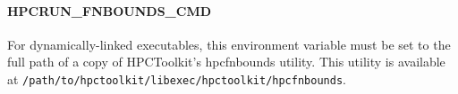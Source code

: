 \paragraph{HPCRUN\_FNBOUNDS\_CMD}

For dynamically-linked executables, this environment variable must
be set to the full path of a copy of HPCToolkit's hpcfnbounds
utility. This utility is available at
\verb|/path/to/hpctoolkit/libexec/hpctoolkit/hpcfnbounds|.


